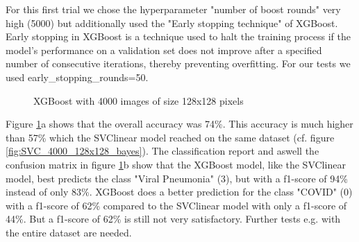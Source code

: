 \documentclass{article}
\begin{document}
For this first trial we chose the hyperparameter "number of boost rounds" very high (5000) but additionally used the "Early stopping technique" of XGBoost. Early stopping in XGBoost
is a technique used to halt the training process if the model's performance on a validation set does not improve after a specified number of consecutive iterations, 
thereby preventing overfitting. For our tests we used early\_stopping\_rounds=50.

\begin{figure}[!ht]
  \centering
  \qquad
  \caption{XGBoost with 4000 images of size 128x128 pixels}
  \label{fig:XGBoost_128_no_aug_mask}
\end{figure}

Figure \ref{fig:XGBoost_128_no_aug_mask}a shows that the overall accuracy was 74\%. This accuracy is much higher than 57\% which the SVClinear model reached on
the same dataset (cf. figure \ref{fig:SVC_4000_128x128_bayes}). The classification report and aswell the confusion matrix in figure \ref{fig:XGBoost_128_no_aug_mask}b 
show that the XGBoost model, like the SVClinear model, best predicts the class "Viral Pneumonia" (3), 
but with a f1-score of 94\% instead of only 83\%. XGBoost does a better prediction for the class "COVID" (0) with a f1-score of 62\% compared to the SVClinear model
with only a f1-score of 44\%. But a f1-score of 62\% is still not very satisfactory. Further tests e.g. with the entire dataset are needed. 
\end{document}
